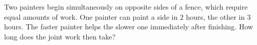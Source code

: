 Two painters begin simultaneously on opposite sides of a fence, which require equal amounts of work. One painter can paint a side in $2$ hours, the other in $3$ hours. The faster painter helps the slower one immediately after finishing. How long does the joint work then take?
